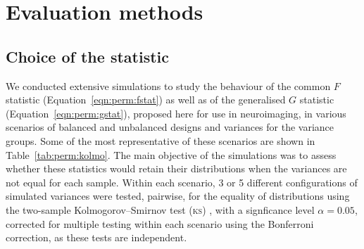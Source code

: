 \section{Evaluation methods}

\subsection{Choice of the statistic}
\label{sec:perm:method_statistic}

We conducted extensive simulations to study the behaviour of the common $F$ statistic (Equation~\ref{eqn:perm:fstat}) as well as of the generalised $G$ statistic (Equation~\ref{eqn:perm:gstat}), proposed here for use in neuroimaging, in various scenarios of balanced and unbalanced designs and variances for the variance groups. Some of the most representative of these scenarios are shown in Table~\ref{tab:perm:kolmo}. The main objective of the simulations was to assess whether these statistics would retain their distributions when the variances are not equal for each sample. Within each scenario, 3 or 5 different configurations of simulated variances were tested, pairwise, for the equality of distributions using the two-sample Kolmogorov--Smirnov test (\textsc{ks}) \citep{Press1992}, with a signficance level $\alpha = 0.05$, corrected for multiple testing within each scenario using the Bonferroni correction, as these tests are independent.

